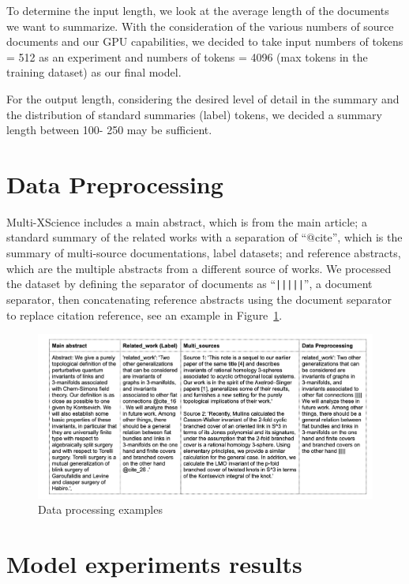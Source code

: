 \documentclass[12pt, twocolumn]{article}
\numberwithin{equation}{section}
\begin{document}
To determine the input length, we look at the average length of the documents we want to summarize. With the consideration of the various numbers of source documents and our GPU capabilities, we decided to take input numbers of tokens = 512 as an experiment and numbers of tokens = 4096 (max tokens in the training dataset) as our final model.

For the output length, considering the desired level of detail in the summary and the distribution of standard summaries (label) tokens, we decided a summary length between 100- 250 may be sufficient.

\section{Data Preprocessing}
\label{sec:dataprocessing}

Multi-XScience includes a main abstract, which is from the main article; a standard summary of the related works with a separation of “@cite”, which is the summary of multi-source documentations, label datasets; and reference abstracts, which are the multiple abstracts from a different source of works. We processed the dataset by defining the separator of documents as ``\texttt{|||||}'', a document separator, then concatenating reference abstracts using the document separator to replace citation reference, see an example in Figure~\ref{fig:X-science-example}.

\begin{figure}
    \includegraphics[width=\textwidth]{X_science_example.png}
    \caption{Data processing examples}
    \label{fig:X-science-example}
\end{figure}


\section{Model experiments results}
\label{sec:results}
\end{document}
